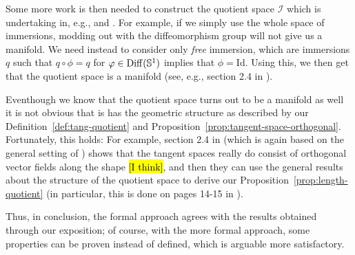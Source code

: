 Some more work is then needed to construct the quotient space $\mathcal{I}$ which is undertaking in, e.g., \cite{michor2003riemannian} and \cite{cervera1991action}. For example, if we simply use the whole space of immersions, modding out with the diffeomorphism group will not give us a manifold. We need instead to consider only \textit{free} immersion, which are immersions $q$ such that $q \circ \phi = q$ for $\phi \in \mathrm{Diff}(\S^1)$ implies that $\phi = \mathrm{Id}$. Using this, we then get that the quotient space is a manifold (see, e.g., section 2.4 in \cite{michor2003riemannian}).

Eventhough we know that the quotient space turns out to be a manifold as well it is not obvious that is has the geometric structure as described by our Definition~\ref{def:tang-quotient} and Proposition~\ref{prop:tangent-space-orthogonal}. Fortunately, this holds: For example, section 2.4 in \cite{michor2003riemannian} (which is again based on the general setting of \cite{kriegl1997convenient}) shows that the tangent spaces really do consist of orthogonal vector fields along the shape \hl{[I think]}, and then they can use the general results about the structure of the quotient space to derive our Proposition~\ref{prop:length-quotient} (in particular, this is done on pages 14-15 in \cite{michor2003riemannian}).

Thus, in conclusion, the formal approach agrees with the results obtained through our exposition; of course, with the more formal approach, some properties can be proven instead of defined, which is arguable more satisfactory.




